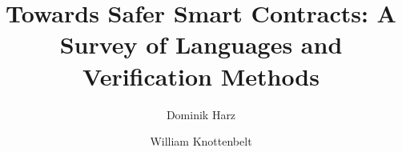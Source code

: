 \documentclass{llncs}
\begin{document}
\title{Towards Safer Smart Contracts: A Survey of Languages and Verification Methods}
\author{Dominik Harz \and William Knottenbelt}



\maketitle

















\printbibliography
\end{document}
